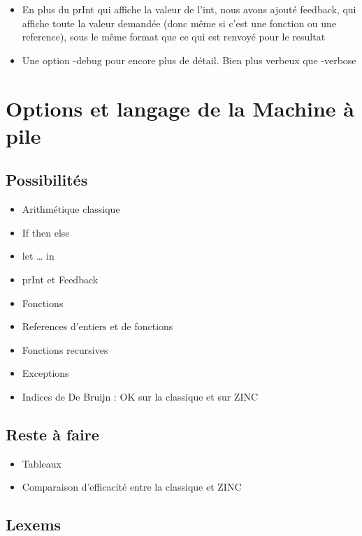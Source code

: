 \begin{itemize}
\tightlist
\item
  En plus du prInt qui affiche la valeur de l'int, nous avons ajouté
  feedback, qui affiche toute la valeur demandée (donc même si c'est une
  fonction ou une reference), sous le même format que ce qui est renvoyé
  pour le resultat
\item
  Une option -debug pour encore plus de détail. Bien plus verbeux que
  -verbose
\end{itemize}

\section{Options et langage de la Machine à
pile}\label{options-et-langage-de-la-machine-uxe0-pile}

\subsection{Possibilités}\label{possibilituxe9s}

\begin{itemize}
\item
  Arithmétique classique
\item
  If then else
\item
  let \ldots{} in
\item
  prInt et Feedback
\item
  Fonctions
\item
  References d'entiers et de fonctions
\item
  Fonctions recursives
\item
  Exceptions
\item
  Indices de De Bruijn : OK sur la classique et sur ZINC
\end{itemize}

\subsection{Reste à faire}\label{reste-uxe0-faire}

\begin{itemize}
\tightlist
\item
  Tableaux
\item
  Comparaison d'efficacité entre la classique et ZINC
\end{itemize}

\subsection{Lexems}\label{lexems}

